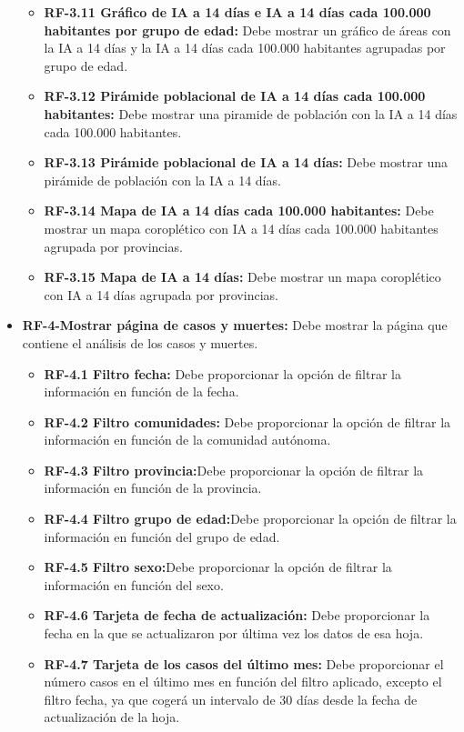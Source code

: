 \begin{itemize}
\begin{itemize}
            \item \textbf{RF-3.11 Gráfico de IA a 14 días e IA a 14 días cada 100.000 habitantes por grupo de edad:} Debe mostrar un gráfico de áreas con la IA a 14 días y la IA a 14 días cada 100.000 habitantes agrupadas por grupo de edad.
            \item \textbf{RF-3.12 Pirámide poblacional de IA a 14 días cada 100.000 habitantes:} Debe mostrar una piramide de población con la IA a 14 días cada 100.000 habitantes.
            \item \textbf{RF-3.13 Pirámide poblacional de IA a 14 días:} Debe mostrar una pirámide de población con la IA a 14 días.
            \item \textbf{RF-3.14 Mapa de IA a 14 días cada 100.000 habitantes:} Debe mostrar un mapa coroplético con IA a 14 días cada 100.000 habitantes agrupada por provincias.
            \item \textbf{RF-3.15 Mapa de IA a 14 días:} Debe mostrar un mapa coroplético con IA a 14 días agrupada por provincias.
    \end{itemize} 
    \item \textbf{RF-4-Mostrar página de casos y muertes:} Debe mostrar la página que contiene el análisis de los casos y muertes.
    \begin{itemize}
        \tightlist
            \item \textbf{RF-4.1 Filtro fecha:} Debe proporcionar la opción de filtrar la información en función de la fecha.
            \item \textbf{RF-4.2 Filtro comunidades:} Debe proporcionar la opción de filtrar la información en función de la comunidad autónoma.
            \item \textbf{RF-4.3 Filtro provincia:}Debe proporcionar la opción de filtrar la información en función de la provincia.
            \item \textbf{RF-4.4 Filtro grupo de edad:}Debe proporcionar la opción de filtrar la información en función del grupo de edad.
            \item \textbf{RF-4.5 Filtro sexo:}Debe proporcionar la opción de filtrar la información en función del sexo.
            \item \textbf{RF-4.6 Tarjeta de fecha de actualización:} Debe proporcionar la fecha en la que se actualizaron por última vez los datos de esa hoja.
            \item \textbf{RF-4.7 Tarjeta de los casos del último mes:} Debe proporcionar el número casos en el último mes en función del filtro aplicado, excepto el filtro fecha, ya que cogerá un intervalo de 30 días desde la fecha de actualización de la hoja.

\end{itemize}
\end{itemize}
